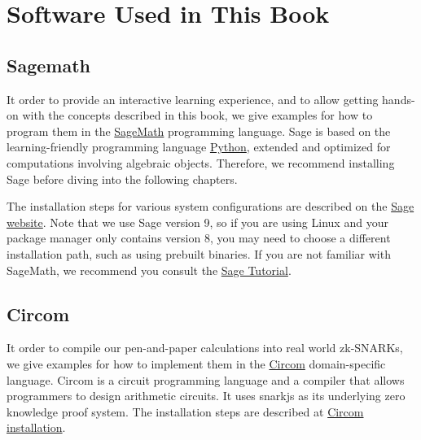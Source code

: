 \chapter{Software Used in This Book}

\section{Sagemath}
\label{sagemath_setup}
It order to provide an interactive learning experience, and to allow getting hands-on with the concepts described in this book, we give examples for how to program them in the \href{https://www.sagemath.org/}{SageMath} programming language. Sage is based on the learning-friendly programming language \href{https://www.python.org/}{Python},  extended and optimized for computations involving algebraic objects. Therefore, we recommend installing Sage before diving into the following chapters.

The installation steps for various system configurations are described on the \href{https://doc.sagemath.org/html/en/installation/index.html}{Sage website}. Note that we use Sage version 9, so if you are using Linux and your package manager only contains version 8, you may need to choose a different installation path, such as using prebuilt binaries. If you are not familiar with SageMath, we recommend you consult the \href{https://doc.sagemath.org/html/en/tutorial/index.html}{Sage Tutorial}.

\section{Circom}
\label{circom_setup}
It order to compile our pen-and-paper calculations into real world zk-SNARKs, we give examples for how to implement them in the \href{https://iden3.io/circom}{Circom} domain-specific language. Circom is a circuit programming language and a compiler that allows programmers to design arithmetic circuits. It uses snarkjs as its underlying zero knowledge proof system. The installation steps are described at \href{https://docs.circom.io/getting-started/installation/#installing-circom}{Circom installation}.

